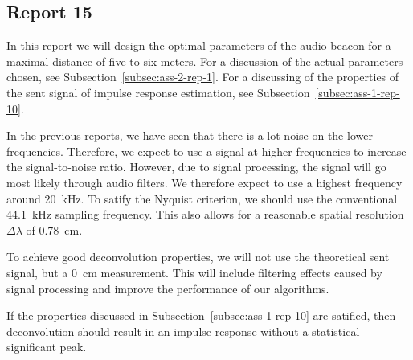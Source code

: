 \documentclass[11pt,titlepage]{report}
\begin{document}
\subsection{Report 15}
In this report we will design the optimal parameters of the audio beacon for a maximal distance of five to six meters. For a discussion of the actual parameters chosen, see Subsection~\ref{subsec:ass-2-rep-1}. For a discussing of the properties of the sent signal of impulse response estimation, see Subsection~\ref{subsec:ass-1-rep-10}.

In the previous reports, we have seen that there is a lot noise on the lower frequencies. Therefore, we expect to use a signal at higher frequencies to increase the signal-to-noise ratio. However, due to signal processing, the signal will go most likely through audio filters. We therefore expect to use a highest frequency around \SI{20}{kHz}. To satify the Nyquist criterion, we should use the conventional \SI{44.1}{kHz} sampling frequency. This also allows for a reasonable spatial resolution $\Delta \lambda$ of \SI{0.78}{cm}.

To achieve good deconvolution properties, we will not use the theoretical sent signal, but a \SI{0}{cm} measurement. This will include filtering effects caused by signal processing and improve the performance of our algorithms.

If the properties discussed in Subsection~\ref{subsec:ass-1-rep-10} are satified, then deconvolution should result in an impulse response without a statistical significant peak.
\end{document}
